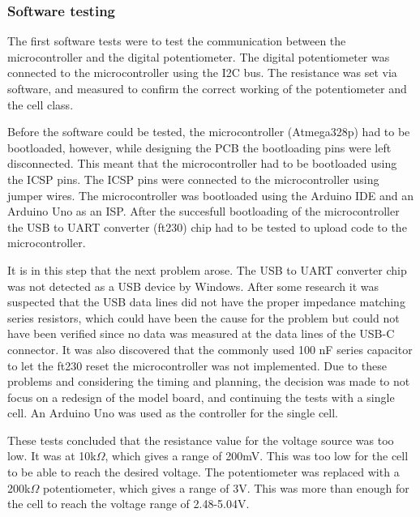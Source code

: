 \subsubsection{Software testing}
The first software tests were to test the communication between the microcontroller and the digital potentiometer. The digital potentiometer was connected to the microcontroller using the I2C bus. The resistance was set via software, and measured to confirm the correct working of the potentiometer and the cell class.

Before the software could be tested, the microcontroller (Atmega328p) had to be bootloaded, however, while designing the PCB the bootloading pins were left disconnected. This meant that the microcontroller had to be bootloaded using the ICSP pins. The ICSP pins were connected to the microcontroller using jumper wires. The microcontroller was bootloaded using the Arduino IDE and an Arduino Uno as an ISP. After the succesfull bootloading of the microcontroller the USB to UART converter (ft230) chip had to be tested to upload code to the microcontroller. 

It is in this step that the next problem arose. The USB to UART converter chip was not detected as a USB device by Windows. After some research it was suspected that the USB data lines did not have the proper impedance matching series resistors, which could have been the cause for the problem but could not have been verified since no data was measured at the data lines of the USB-C connector. It was also discovered that the commonly used 100 nF series capacitor to let the ft230 reset the microcontroller was not implemented. Due to these problems and considering the timing and planning, the decision was made to not focus on a redesign of the model board, and continuing the tests with a single cell. An Arduino Uno was used as the controller for the single cell.

These tests concluded that the resistance value for the voltage source was too low. It was at 10k$\Omega$, which gives a range of 200mV. This was too low for the cell to be able to reach the desired voltage. The potentiometer was replaced with a 200k$\Omega$ potentiometer, which gives a range of 3V. This was more than enough for the cell to reach the voltage range of 2.48-5.04V.